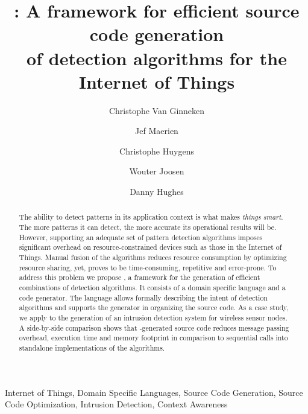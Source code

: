 \documentclass[3p,times,procedia]{elsarticle}
\begin{document}
\begin{frontmatter}


\title{
\FOO: A framework for efficient source code generation\\
of detection algorithms for the Internet of Things
}

\author{Christophe Van Ginneken}
\author{Jef Maerien}
\author{Christophe Huygens}
\author{Wouter Joosen}
\author{Danny Hughes}

\address{
iMinds-DistriNet, KU Leuven, 3001 Leuven, Belgium\\
\{firstname.lastname\}@cs.kuleuven.be
}

\begin{abstract}

The ability to detect patterns in its application context is what makes
\emph{things} \emph{smart}. The more patterns it can detect, the more accurate
its operational results will be. However, supporting an adequate set of pattern
detection algorithms imposes significant overhead on resource-constrained
devices such as those in the Internet of Things. Manual fusion of the
algorithms reduces resource consumption by optimizing resource sharing, yet,
proves to be time-consuming, repetitive and error-prone. To address this
problem we propose \FOO, a framework for the generation of efficient
combinations of detection algorithms. It consists of a domain specific language
and a code generator. The language allows formally describing the intent of
detection algorithms and supports the generator in organizing the source code.
As a case study, we apply \FOO to the generation of an intrusion detection
system for wireless sensor nodes. A side-by-side comparison shows that
\FOO-generated source code reduces message passing overhead, execution time and
memory footprint in comparison to sequential calls into standalone
implementations of the algorithms.

\end{abstract}

\begin{keyword}

Internet of Things, Domain Specific Languages, Source Code Generation, Source
Code Optimization, Intrusion Detection, Context Awareness

\end{keyword}

\end{frontmatter}
\end{document}
